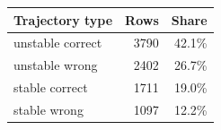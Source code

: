 \begin{tabular}{lrr}
\toprule
Trajectory type & Rows & Share \\
\midrule
unstable correct & 3790 & 42.1\% \\
unstable wrong & 2402 & 26.7\% \\
stable correct & 1711 & 19.0\% \\
stable wrong & 1097 & 12.2\% \\
\bottomrule
\end{tabular}

